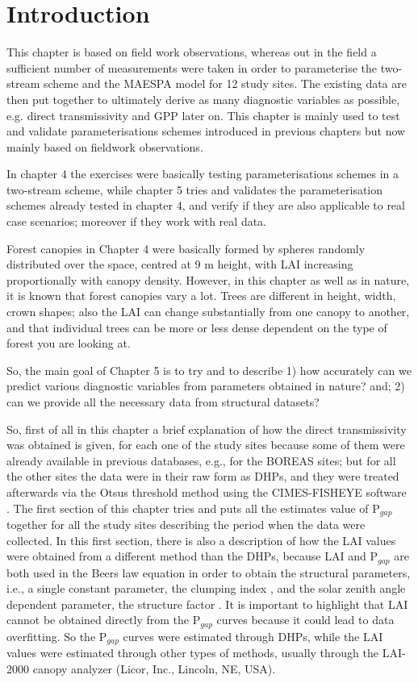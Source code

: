 \section{Introduction}\label{introduction}

This chapter is based on field work observations, whereas out in the field a sufficient number of measurements were taken in order to parameterise the two-stream scheme and the MAESPA model for 12 study sites. The existing data are then put together to ultimately derive as many diagnostic variables as possible, e.g. direct transmissivity and GPP later on. This chapter is mainly used to test and validate parameterisations schemes introduced in previous chapters but now mainly based on fieldwork observations.

In chapter 4 the exercises were basically testing parameterisations schemes in a two-stream scheme, while chapter 5 tries and validates the parameterisation schemes already tested in chapter 4, and verify if they are also applicable to real case scenarios; moreover if they work with real data.

Forest canopies in Chapter 4 were basically formed by spheres randomly distributed over the space, centred at 9 m height, with LAI increasing proportionally with canopy density. However, in this chapter as well as in nature, it is known that forest canopies vary a lot. Trees are different in height, width, crown shapes; also the LAI can change substantially from one canopy to another, and that individual trees can be more or less dense dependent on the type of forest you are looking at. 

So, the main goal of Chapter 5 is to try and to describe 1) how accurately can we predict various diagnostic variables from parameters obtained in nature? and; 2) can we provide all the necessary data from structural datasets?

So, first of all in this chapter a brief explanation of how the direct transmissivity was obtained is given, for each one of the study sites because some of them were already available in previous databases, e.g., for the BOREAS sites; but for all the other sites the data were in their raw form as DHPs, and they were treated afterwards via the Otsu\textquotesingle s threshold method \citep{Otsu1979} using the CIMES-FISHEYE software \citep{Walter2012}. The first section of this chapter tries and puts all the estimates value of P$_{gap}$ together for all the study sites describing the period when the data were collected. In this first section, there is also a description of how the LAI values were obtained from a different method than the DHPs, because LAI and P$_{gap}$ are both used in the Beer\textquotesingle s law equation in order to obtain the structural parameters, i.e., a single constant parameter, the clumping index \citep{Nilson1971}, and the solar zenith angle dependent parameter, the structure factor \citep{pinty2006}. It is important to highlight that LAI cannot be obtained directly from the P$_{gap}$ curves because it could lead to data overfitting. So the P$_{gap}$ curves were estimated through DHPs, while the LAI values were estimated through other types of methods, usually through the LAI-2000 canopy analyzer (Licor, Inc., Lincoln, NE, USA).

